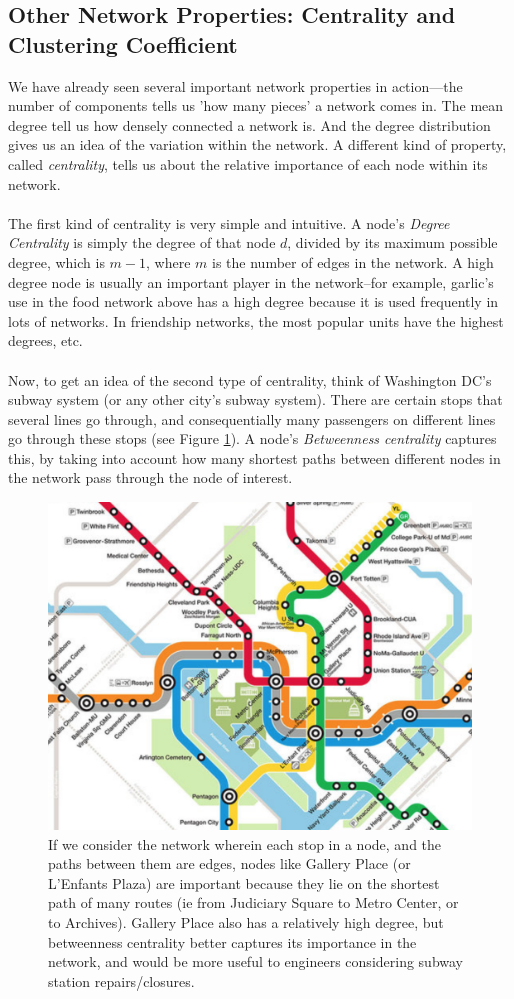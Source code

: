 \documentclass[12pt]{article}
\begin{document}
\subsection{Other Network Properties: Centrality and Clustering Coefficient}
We have already seen several important network properties in action---the number of components tells us 'how many pieces' a network comes in. The mean degree tell us how densely connected a network is. And the degree distribution gives us an idea of the variation within the network. A different kind of property, called \emph{centrality}, tells us about the relative importance of each node within its network.\\
\\
The first kind of centrality is very simple and intuitive. A node's \emph{Degree Centrality} is simply the degree of that node $d$, divided by  its maximum possible degree, which is $m-1$, where $m$ is the number of edges in the network. A high degree node is usually an important player in the network--for example, garlic's use in the food network above has a high degree because it is used frequently in lots of networks. In friendship networks, the most popular units have the highest degrees, etc.\\
\\
Now, to get an idea of the second type of centrality, think of Washington DC's subway system (or any other city's subway system). There are certain stops that several lines go through, and consequentially many passengers on different lines go through these stops (see Figure \ref{subway}). A node's \emph{Betweenness centrality} captures this, by taking into account how many shortest paths between different nodes in the network pass through the node of interest. 
\begin{figure}[htbp]
\begin{center}
\includegraphics[width=.8\linewidth]{subway.png}
\caption{If we consider the network wherein each stop in a node, and the paths between them are edges, nodes like Gallery Place (or L'Enfants Plaza) are important because they lie on the shortest path of many routes (ie from Judiciary Square to Metro Center, or to Archives). Gallery Place also has a relatively high degree, but betweenness centrality better captures its importance in the network, and would be more useful to engineers considering subway station repairs/closures.}
\label{subway}
\end{center}
\end{figure}
\end{document}
